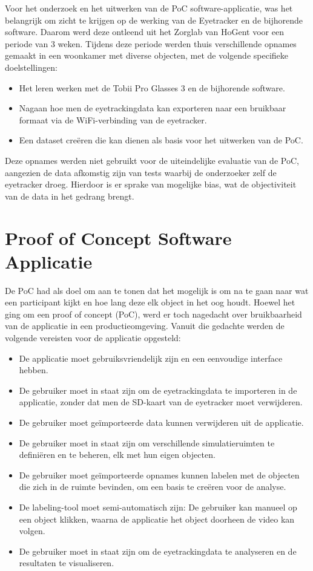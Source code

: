 Voor het onderzoek en het uitwerken van de PoC software-applicatie, was het belangrijk om zicht te krijgen op de werking van de Eyetracker en de bijhorende software.
Daarom werd deze ontleend uit het Zorglab van HoGent voor een periode van 3 weken. 
Tijdens deze periode werden thuis verschillende opnames gemaakt in een woonkamer met diverse objecten, met de volgende specifieke doelstellingen:
\begin{itemize}
    \item Het leren werken met de Tobii Pro Glasses 3 en de bijhorende software.
    \item Nagaan hoe men de eyetrackingdata kan exporteren naar een bruikbaar formaat via de WiFi-verbinding van de eyetracker.
    \item Een dataset creëren die kan dienen als basis voor het uitwerken van de PoC.
\end{itemize}
Deze opnames werden niet gebruikt voor de uiteindelijke evaluatie van de PoC, aangezien de data afkomstig zijn van tests waarbij de onderzoeker zelf de eyetracker droeg.
Hierdoor is er sprake van mogelijke bias, wat de objectiviteit van de data in het gedrang brengt.

\section{Proof of Concept Software Applicatie}

De PoC had als doel om aan te tonen dat het mogelijk is om na te gaan naar wat een participant kijkt en hoe lang deze elk object in het oog houdt.
Hoewel het ging om een proof of concept (PoC), werd er toch nagedacht over bruikbaarheid van de applicatie in een productieomgeving.
Vanuit die gedachte werden de volgende vereisten voor de applicatie opgesteld:
\begin{itemize}
    \item De applicatie moet gebruiksvriendelijk zijn en een eenvoudige interface hebben.
    \item De gebruiker moet in staat zijn om de eyetrackingdata te importeren in de applicatie, zonder dat men de SD-kaart van de eyetracker moet verwijderen.
    \item De gebruiker moet geïmporteerde data kunnen verwijderen uit de applicatie.
    \item De gebruiker moet in staat zijn om verschillende simulatieruimten te definiëren en te beheren, elk met hun eigen objecten.
    \item De gebruiker moet geïmporteerde opnames kunnen labelen met de objecten die zich in de ruimte bevinden, om een basis te creëren voor de analyse.
    \item De labeling-tool moet semi-automatisch zijn: De gebruiker kan manueel op een object klikken, waarna de applicatie het object doorheen de video kan volgen.
    \item De gebruiker moet in staat zijn om de eyetrackingdata te analyseren en de resultaten te visualiseren.
\end{itemize}

